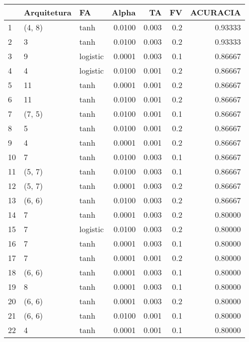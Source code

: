 \begin{tabular}{lllrrrr}
\toprule
{} & Arquitetura &        FA &   Alpha &     TA &   FV &  ACURACIA \\
\midrule
1   &      (4, 8) &      tanh &  0.0100 &  0.003 &  0.2 &   0.93333 \\
2   &           3 &      tanh &  0.0100 &  0.003 &  0.2 &   0.93333 \\
3   &           9 &  logistic &  0.0001 &  0.003 &  0.1 &   0.86667 \\
4   &           4 &  logistic &  0.0100 &  0.001 &  0.2 &   0.86667 \\
5   &          11 &      tanh &  0.0001 &  0.001 &  0.2 &   0.86667 \\
6   &          11 &      tanh &  0.0100 &  0.001 &  0.2 &   0.86667 \\
7   &      (7, 5) &      tanh &  0.0100 &  0.001 &  0.1 &   0.86667 \\
8   &           5 &      tanh &  0.0100 &  0.001 &  0.2 &   0.86667 \\
9   &           4 &      tanh &  0.0001 &  0.001 &  0.2 &   0.86667 \\
10  &           7 &      tanh &  0.0100 &  0.003 &  0.1 &   0.86667 \\
11  &      (5, 7) &      tanh &  0.0100 &  0.003 &  0.1 &   0.86667 \\
12  &      (5, 7) &      tanh &  0.0001 &  0.003 &  0.2 &   0.86667 \\
13  &      (6, 6) &      tanh &  0.0100 &  0.003 &  0.2 &   0.86667 \\
14  &           7 &      tanh &  0.0001 &  0.003 &  0.2 &   0.80000 \\
15  &           7 &  logistic &  0.0100 &  0.003 &  0.2 &   0.80000 \\
16  &           7 &      tanh &  0.0001 &  0.003 &  0.1 &   0.80000 \\
17  &           7 &      tanh &  0.0001 &  0.001 &  0.2 &   0.80000 \\
18  &      (6, 6) &      tanh &  0.0001 &  0.003 &  0.1 &   0.80000 \\
19  &           8 &      tanh &  0.0001 &  0.003 &  0.1 &   0.80000 \\
20  &      (6, 6) &      tanh &  0.0001 &  0.003 &  0.2 &   0.80000 \\
21  &      (6, 6) &      tanh &  0.0100 &  0.001 &  0.1 &   0.80000 \\
22  &           4 &      tanh &  0.0001 &  0.001 &  0.1 &   0.80000 \\

\end{tabular}
